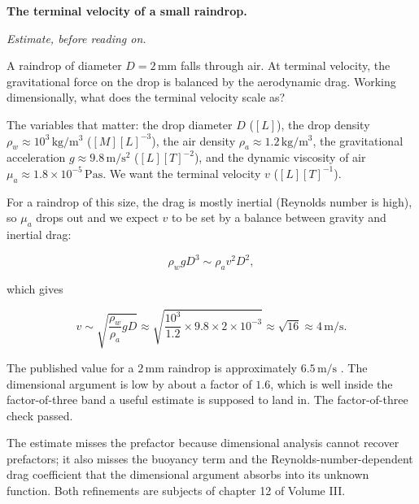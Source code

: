 \begin{estimation}
\textbf{The terminal velocity of a small raindrop.}

\smallskip
\textit{Estimate, before reading on.}

\smallskip
A raindrop of diameter $D = 2 \,\si{\milli\meter}$ falls through air.
At terminal velocity, the gravitational force on the drop is balanced
by the aerodynamic drag. Working dimensionally, what does the
terminal velocity scale as?

The variables that matter: the drop diameter $D$ ($[L]$), the drop
density $\rho_{w} \approx 10^{3} \,\si{\kilogram\per\meter\cubed}$
($[M][L]^{-3}$), the air density $\rho_{a} \approx 1.2 \,\si
{\kilogram\per\meter\cubed}$, the gravitational acceleration $g
\approx 9.8 \,\si{\meter\per\second\squared}$ ($[L][T]^{-2}$), and
the dynamic viscosity of air $\mu_{a} \approx 1.8 \times 10^{-5}
\,\si{\pascal\second}$. We want the terminal velocity $v$ ($[L][T]^
{-1}$).

For a raindrop of this size, the drag is mostly inertial (Reynolds
number is high), so $\mu_{a}$ drops out and we expect $v$ to be set
by a balance between gravity and inertial drag:

\[
\rho_{w} g D^{3} \sim \rho_{a} v^{2} D^{2},
\]

which gives

\[
v \sim \sqrt{\frac{\rho_{w}}{\rho_{a}} g D} \approx \sqrt{\frac{10^{3}}
{1.2} \times 9.8 \times 2 \times 10^{-3}} \approx \sqrt{16} \approx
4 \,\si{\meter\per\second}.
\]

The published value for a $2 \,\si{\milli\meter}$ raindrop is
approximately $6.5 \,\si{\meter\per\second}$
\cite{paper:gunn-kinzer1949}. The dimensional argument is low by
about a factor of $1.6$, which is well inside the factor-of-three
band a useful estimate is supposed to land in. The factor-of-three
check passed.

The estimate misses the prefactor because dimensional analysis cannot
recover prefactors; it also misses the buoyancy term and the
Reynolds-number-dependent drag coefficient that the dimensional
argument absorbs into its unknown function. Both refinements are
subjects of chapter 12 of Volume III.
\end{estimation}

